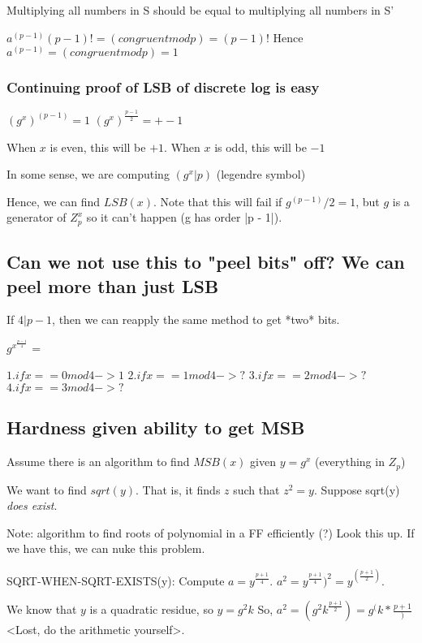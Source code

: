 Multiplying all numbers in S should be equal to multiplying all numbers in S'


$a^(p - 1) (p - 1)! =(congruent mod p)= (p - 1)!$
Hence $a^(p - 1) =(congruent mod p)= 1$

\subsubsection{Continuing proof of LSB of discrete log is easy}

$(g^x)^(p - 1) = 1$
$(g^x)^{\frac{p - 1}{2}} = +-1$

When $x$ is even, this will be $+1$. When $x$ is odd, this will be $-1$

In some sense, we are computing $(g^x|p)$ (legendre symbol)

Hence, we can find $LSB(x)$. Note that this will fail if $g^(p - 1)/2 = 1$,
but $g$ is a generator of $Z_p^x$ so it can't happen (g has order |p - 1|).


\subsection{Can we not use this to "peel bits" off? We can peel more than just LSB}

If $4 | p - 1$, then we can reapply the same method to get *two* bits.


$g^{x^{\frac{p - 1}{4}}}$ =

$1. if x == 0 mod 4 -> 1$
$2. if x == 1 mod 4 -> ?$
$3. if x == 2 mod 4 -> ?$
$4. if x == 3 mod 4 -> ?$

\subsection{Hardness given ability to get MSB}

Assume there is an algorithm to find $MSB(x)$ given $y = g^x$ (everything in $Z_p$)

We want to find $sqrt(y)$. That is, it finds $z$ such that $z^2 = y$. Suppose 
sqrt(y) \textit{does exist}.

Note: algorithm to find roots of polynomial in a FF efficiently (?) Look this up. If we 
have this, we can nuke this problem.

SQRT-WHEN-SQRT-EXISTS(y):
Compute $a = y^\frac{p + 1}{4}$.
$a^2 = y^\frac{p + 1}{4})^2 = y^(\frac{p + 1}{2})$.

We know that $y$ is a quadratic residue, so $y = g^2k$
So, $a^2 = (g^2k^\frac{p + 1}{2}) = g^(k * \frac{p + 1})$
<Lost, do the arithmetic yourself>.


